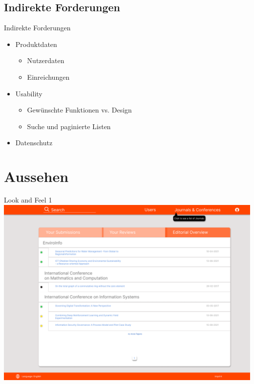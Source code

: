 \documentclass{beamer}
\begin{document}
\subsection{Indirekte Forderungen}
\begin{frame}{Indirekte Forderungen}
		\begin{itemize}
		\item Produktdaten
		\begin{itemize}
			\item Nutzerdaten
			\item Einreichungen
		\end{itemize}
		\pause
		\item Usability
		\begin{itemize}
			\item Gewünschte Funktionen vs. Design
			\item Suche und paginierte Listen
		\end{itemize}
		\pause
		\item Datenschutz
	\end{itemize}
\end{frame}

\section{Aussehen}
\begin{frame}{Look and Feel 1}
	\centering
	\includegraphics[height=0.9\textheight]{../../docs/Pflichtenheft/graphics/Homepage-png}
\end{frame}
\end{document}
